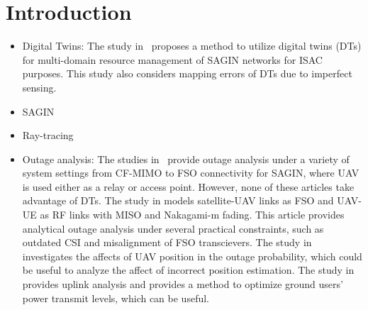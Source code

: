 \section{Introduction}
\begin{itemize}
    \item Digital Twins: The study in~\cite{dt_resource} proposes a method to utilize digital twins (DTs) for multi-domain resource management of SAGIN networks for ISAC purposes. This study also considers mapping errors of DTs due to imperfect sensing.   
    \item SAGIN 
    \item Ray-tracing
    \item Outage analysis: The studies in~\cite{o_altitude,o_cfmimo,o_fso} provide outage analysis under a variety of system settings from CF-MIMO to FSO connectivity for SAGIN, where UAV is used either as a relay or access point. However, none of these articles take advantage of DTs.
    The study in \cite{o_fso} models satellite-UAV links as FSO and UAV-UE as RF links with MISO and Nakagami-m fading. This article provides analytical outage analysis under several practical constraints, such as outdated CSI and misalignment of FSO transcievers. The study in~\cite{o_altitude} investigates the affects of UAV position in the outage probability, which could be useful to analyze the affect of incorrect position estimation. The study in~\cite{o_cfmimo} provides uplink analysis and provides a method to optimize ground users' power transmit levels, which can be useful.
\end{itemize}


